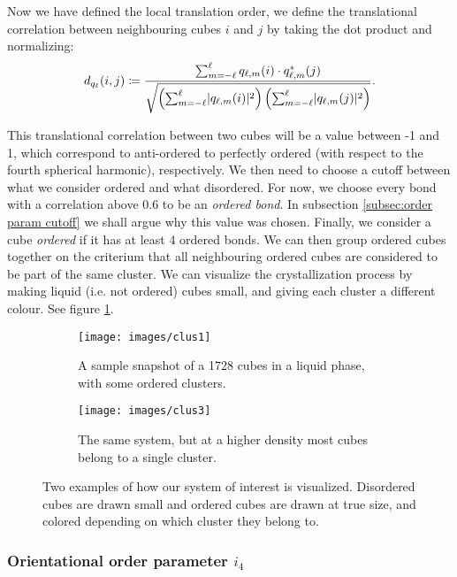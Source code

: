 \documentclass[thesis]{subfiles}
\begin{document}
Now we have defined the local translation order, we define the translational correlation between neighbouring cubes $i$ and $j$ by taking the dot product and normalizing:
\begin{equation}
	d_{q_\ell}(i, j) \coloneqq \frac{\sum_{m = -\ell}^\ell q_{\ell, m}(i) \cdot q^*_{\ell, m}(j)}{\sqrt{\left(\sum_{m = -\ell}^\ell \lvert q_{\ell, m}(i)\rvert^2\right) \left(\sum_{m = -\ell}^\ell \lvert q_{\ell, m}(j)\rvert^2\right)}}.
\end{equation}

This translational correlation between two cubes will be a value between -1 and 1, which correspond to anti-ordered to perfectly ordered (with respect to the fourth spherical harmonic), respectively. We then need to choose a cutoff between what we consider ordered and what disordered. For now, we choose every bond with a correlation above 0.6 to be an \emph{ordered bond}. In subsection \ref{subsec:order param cutoff} we shall argue why this value was chosen.
Finally, we consider a cube \emph{ordered} if it has at least 4 ordered bonds. We can then group ordered cubes together on the criterium that all neighbouring ordered cubes are considered to be part of the same cluster. We can visualize the crystallization process by making liquid (i.e. not ordered) cubes small, and giving each cluster a different colour. See figure \ref{fig:sample_snapshot}.

\begin{figure}
	\centering
	\begin{subfigure}{0.48\textwidth}
		\centering
		\texttt{[image: images/clus1]}
		\caption{A sample snapshot of a 1728 cubes in a liquid phase, with some ordered clusters.}
	\end{subfigure}\hfill
	\begin{subfigure}{0.48\textwidth}
		\centering
		\texttt{[image: images/clus3]}
		\caption{The same system, but at a higher density most cubes belong to a single cluster.}
	\end{subfigure}
	\caption{Two examples of how our system of interest is visualized. Disordered cubes are drawn small and ordered cubes are drawn at true size, and colored depending on which cluster they belong to.}
	\label{fig:sample_snapshot}
\end{figure}

\subsubsection{Orientational order parameter \texorpdfstring{$i_4$}{i4}}
\end{document}
